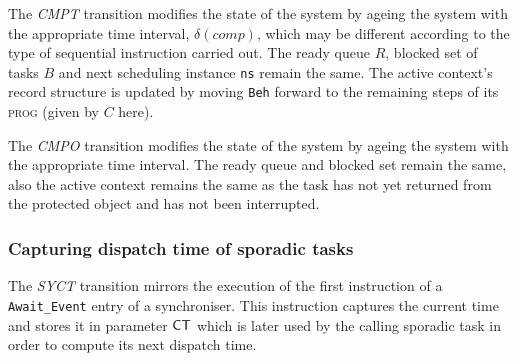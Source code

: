 The \emph{CMPT} transition modifies the state of the system by ageing
the system with the appropriate time interval, $\delta(comp)$, which
may be different according to the type of sequential instruction
carried out. The ready queue $R$, blocked set of tasks $B$ and next
scheduling instance \texttt{ns} remain the same. The active context's
record structure is updated by moving \texttt{Beh} forward to the
remaining steps of its {\scshape prog} (given by $C$ here).


The \emph{CMPO} transition modifies the state of the system by ageing
the system with the appropriate time interval. The ready queue and
blocked set remain the same, also the active context remains the same
as the task has not yet returned from the protected object and has not
been interrupted.

\subsubsection{Capturing dispatch time of sporadic tasks}
The \emph{SYCT} transition mirrors the execution of the first
instruction of a \texttt{Await\_Event} entry of a synchroniser. This
instruction captures the current time and stores it in parameter
$\text{\sffamily CT}$ which is later used by the calling sporadic task in order
to compute its next dispatch time.


